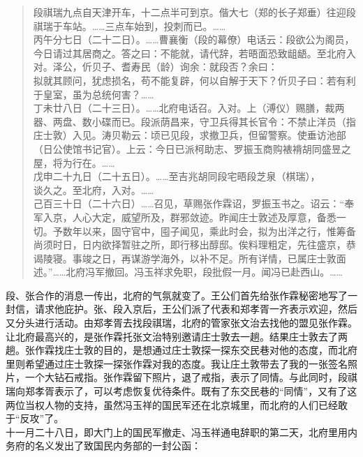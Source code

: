 \begin{quote}
	段祺瑞九点自天津开车，十二点半可到京。偕大七（郑的长子郑垂）往迎段祺瑞于车站。……三点车始到，投刺而已。……\\

丙午分七日（二十二日）。……曹襄衡（段的幕僚）电话云：段欲公为阁员，今日请过其居商之。答之曰：不能就，请代辞，若晤面恐致龃龉。至北府入对。泽公，伒贝子、耆寿民（龄）询余：就段否？余曰：\\

拟就其顾问，犹虑损名，苟不能复辟，何以自解于天下？伒贝子曰：若有利于皇室，虽为总统何害？……\\

丁未廿八日（二十三日）。……北府电话召。入对。上（溥仪）赐膳，裁两器、两盘、数小碟而已。段派荫昌来，守卫兵得其长官令：不禁止洋员（指庄士敦）入见。涛贝勒云：顷已见段，求撤卫兵，但留警察。使垂访池部（日公使馆书记官）。上云：今日已派柯助志、罗振玉商购裱褙胡同盛昱之屋，将为行在。……\\

戊申二十九日（二十五日）。……至吉兆胡同段宅晤段芝泉（棋瑞），\\

谈久之。至北府，入对。……\\

己百三十日（二十六日）……召见，草赐张作霖诏，罗振玉书之。诏云：“奉军入京，人心大定，威望所及，群邪敛迹。昨闻庄士敦述及厚意，备悉一切。予数年以来，固守官中，囤子闻见，乘此时会，拟为出洋之行，惟筹备尚须时日，日内欲择暂驻之所，即行移出醇邸。俟料理粗定，先往盛京，恭谒陵寝。事竣之日，再谋游学海外，以补不足。所有详情，已属庄士敦面述。”……北府冯军撤回。冯玉祥求免职，段批假一月。闻冯已赴西山。……\\
\end{quote}

段、张合作的消息一传出，北府的气氛就变了。王公们首先给张作霖秘密地写了一封信，请求他庇护。张、段入京后，王公们派了代表和郑孝胥一齐表示欢迎，然后又分头进行活动。由郑孝胥去找段祺瑞，北府的管家张文治去找他的盟见张作霖。让北府最高兴的，是张作霖托张文治特别邀请庄士敦去一趟。结果庄士敦去了两趟。张作霖找庄士敦的目的，是想通过庄士敦探一探东交民巷对他的态度，而北府里则希望通过庄士敦探一探张作霖对我的态度。我让庄土敦带去了我的一张签名照片，一个大钻石戒指。张作霖留下照片，退了戒指，表示了同情。与此同时，段祺瑞向郑孝胥表示了，可以考虑恢复优待条件。既有了东交民巷的“同情”，又有了这两位当权人物的支持，虽然冯玉祥的国民军还在北京城里，而北府的人们已经敢于“反攻”了。\\

十一月二十八日，即大门上的国民军撤走、冯玉祥通电辞职的第二天，北府里用内务府的名义发出了致国民内务部的一封公函：\\

